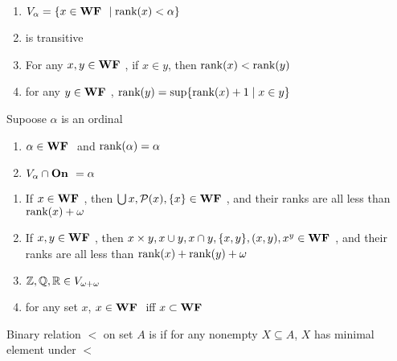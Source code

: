 \documentclass[11pt]{article}
\begin{document}
\begin{lemma}[]
\begin{enumerate}
\item \(V_\alpha=\{x\in\textbf{WF }\mid\text{rank}(x)<\alpha\}\)
\item \wf is transitive
\item For any \(x,y\in\textbf{WF }\), if \(x\in y\), then \(\text{rank}(x)<\text{rank}(y)\)
\item for any \(y\in\textbf{WF }\), \(\text{rank}(y)=\sup\{\text{rank}(x)+1\mid x\in y\}\)
\end{enumerate}
\end{lemma}

\begin{lemma}[]
Supoose \(\alpha\) is an ordinal
\begin{enumerate}
\item \(\alpha\in\textbf{WF }\) and \(\text{rank}(\alpha)=\alpha\)
\item \(V_\alpha\cap\textbf{On }=\alpha\)
\end{enumerate}
\end{lemma}

\begin{lemma}[]
\begin{enumerate}
\item If \(x\in\textbf{WF }\), then \(\bigcup x,\mathcal{P}(x),\{x\}\in\textbf{WF }\), and their ranks are
all less than \(\text{rank}(x)+\omega\)
\item If \(x,y\in\textbf{WF }\), then \(x\times y,x\cup y,x\cap y,\{x,y\},(x,y),x^y\in\textbf{WF }\),
and their ranks are all less than \(\text{rank}(x)+\text{rank}(y)+\omega\)
\item \(\mathbb{Z},\mathbb{Q},\mathbb{R}\in V_{\omega+\omega}\)
\item for any set \(x\), \(x\in\textbf{WF }\) iff \(x\subset\textbf{WF }\)
\end{enumerate}
\end{lemma}


\begin{definition}[]
Binary relation \(<\) on set \(A\) is  if for any nonempty
\(X\subseteq A\), \(X\) has minimal element under \(<\)
\end{definition}
\end{document}
